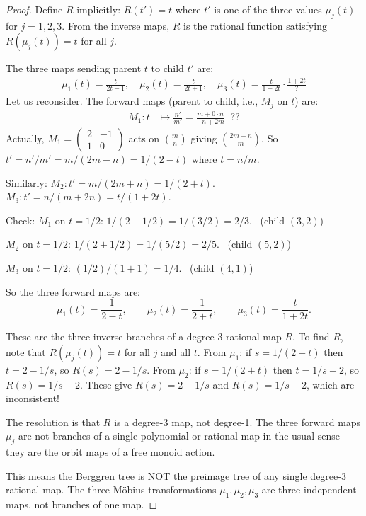 \documentclass[12pt]{amsart}
\theoremstyle{definition}
\theoremstyle{remark}
\begin{document}
\begin{proof}
Define $R$ implicitly: $R(t') = t$ where $t'$ is one of the three values
$\mu_j(t)$ for $j=1,2,3$.  From the inverse maps, $R$ is the rational
function satisfying $R(\mu_j(t))=t$ for all $j$.

The three maps sending parent $t$ to child $t'$ are:
\begin{align*}
  \mu_1(t) = \frac{t}{2t-1}, \quad
  \mu_2(t) = \frac{t}{2t+1}, \quad
  \mu_3(t) = \frac{t}{1+2t}\cdot\frac{1+2t}{?}
\end{align*}
Let us reconsider.  The forward maps (parent to child, i.e., $M_j$ on $t$)
are:
\begin{align*}
  M_1: t &\mapsto \frac{n'}{m'} = \frac{m+0\cdot n}{-n+2m}\;\;??
\end{align*}
Actually, $M_1 = \left(\begin{smallmatrix}2&-1\\1&0\end{smallmatrix}\right)$
acts on $\binom{m}{n}$ giving $\binom{2m-n}{m}$.  So $t' = n'/m' = m/(2m-n)
= 1/(2-t)$ where $t=n/m$.

Similarly: $M_2: t'=m/(2m+n) = 1/(2+t)$.  $M_3: t' = n/(m+2n) = t/(1+2t)$.

Check: $M_1$ on $t=1/2$: $1/(2-1/2)=1/(3/2)=2/3$. \checkmark\ (child $(3,2)$)

$M_2$ on $t=1/2$: $1/(2+1/2) = 1/(5/2) = 2/5$. \checkmark\ (child $(5,2)$)

$M_3$ on $t=1/2$: $(1/2)/(1+1) = 1/4$. \checkmark\ (child $(4,1)$)

So the three forward maps are:
\begin{equation}\label{eq:forward-maps}
  \mu_1(t) = \frac{1}{2-t}, \qquad
  \mu_2(t) = \frac{1}{2+t}, \qquad
  \mu_3(t) = \frac{t}{1+2t}.
\end{equation}

These are the three inverse branches of a degree-3 rational map $R$.
To find $R$, note that $R(\mu_j(t)) = t$ for all $j$ and all $t$.
From $\mu_1$: if $s = 1/(2-t)$ then $t = 2-1/s$, so $R(s)=2-1/s$.
From $\mu_2$: if $s = 1/(2+t)$ then $t = 1/s-2$, so $R(s)=1/s-2$.
These give $R(s) = 2-1/s$ and $R(s) = 1/s-2$, which are inconsistent!

The resolution is that $R$ is a degree-3 map, not degree-1.
The three forward maps $\mu_j$ are not branches of a single polynomial
or rational map in the usual sense---they are the orbit maps of a
free monoid action.

This means the Berggren tree is NOT the preimage tree of any single
degree-3 rational map.  The three M\"obius transformations $\mu_1, \mu_2,
\mu_3$ are three independent maps, not branches of one map.
\end{proof}
\end{document}
